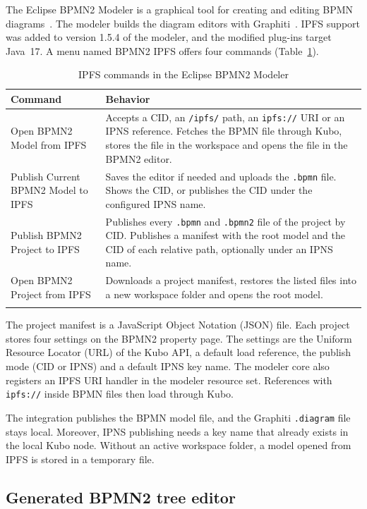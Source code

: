 \documentclass[iicol,pdflatex,sn-mathphys-num]{sn-jnl}
\theoremstyle{thmstylethree}%
\begin{document}
The Eclipse BPMN2 Modeler is a graphical tool for creating and editing BPMN diagrams~\cite{bpmn2modeler,omg2010bpmn}. The modeler builds the diagram editors with Graphiti~\cite{graphiti}. IPFS support was added to version 1.5.4 of the modeler, and the modified plug-ins target Java~17. A menu named BPMN2 IPFS offers four commands (Table~\ref{tab:commands}).

\begin{table}[t]
\caption{IPFS commands in the Eclipse BPMN2 Modeler}\label{tab:commands}
\begin{tabular}{@{}p{}p{}@{}}
\toprule
Command & Behavior \\
\midrule
Open BPMN2 Model from IPFS & Accepts a CID, an \texttt{/ipfs/} path, an \texttt{ipfs://} URI or an IPNS reference. Fetches the BPMN file through Kubo, stores the file in the workspace and opens the file in the BPMN2 editor. \\
Publish Current BPMN2 Model to IPFS & Saves the editor if needed and uploads the \texttt{.bpmn} file. Shows the CID, or publishes the CID under the configured IPNS name. \\
Publish BPMN2 Project to IPFS & Publishes every \texttt{.bpmn} and \texttt{.bpmn2} file of the project by CID. Publishes a manifest with the root model and the CID of each relative path, optionally under an IPNS name. \\
Open BPMN2 Project from IPFS & Downloads a project manifest, restores the listed files into a new workspace folder and opens the root model. \\
\botrule
\end{tabular}
\end{table}

The project manifest is a JavaScript Object Notation (JSON) file. Each project stores four settings on the BPMN2 property page. The settings are the Uniform Resource Locator (URL) of the Kubo API, a default load reference, the publish mode (CID or IPNS) and a default IPNS key name. The modeler core also registers an IPFS URI handler in the modeler resource set. References with \texttt{ipfs://} inside BPMN files then load through Kubo.

The integration publishes the BPMN model file, and the Graphiti \texttt{.diagram} file stays local. Moreover, IPNS publishing needs a key name that already exists in the local Kubo node. Without an active workspace folder, a model opened from IPFS is stored in a temporary file.

\subsection{Generated BPMN2 tree editor}\label{sec:tool-editor}
\end{document}
